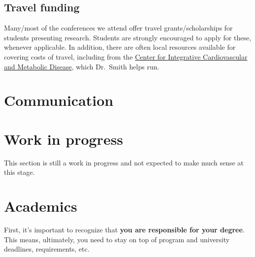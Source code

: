 \documentclass[
  letterpaper,
  DIV=11,
  numbers=noendperiod]{scrreprt}
\begin{document}
\hypertarget{travel-funding}{%
\section{Travel funding}\label{travel-funding}}

Many/most of the conferences we attend offer travel grants/scholarships
for students presenting research. Students are strongly encouraged to
apply for these, whenever applicable. In addition, there are often local
resources available for covering costs of travel, including from the
\href{http://cicmd.center.ufl.edu/resources-2/cicmd-travel-awards-forms/}{Center
for Integrative Cardiovascular and Metabolic Disease}, which Dr.~Smith
helps run.


\hypertarget{sec-communication}{%
\chapter{Communication}\label{sec-communication}}

\begin{tcolorbox}[enhanced jigsaw, colframe=quarto-callout-caution-color-frame, opacityback=0, leftrule=.75mm, bottomrule=.15mm, rightrule=.15mm, left=2mm, toptitle=1mm, colback=white, bottomtitle=1mm, titlerule=0mm, title=\textcolor{quarto-callout-caution-color}{\faFire}\hspace{0.5em}{Danger}, arc=.35mm, toprule=.15mm, breakable, coltitle=black, colbacktitle=quarto-callout-caution-color!10!white, opacitybacktitle=0.6]


\hypertarget{work-in-progress-3}{%
\chapter{Work in progress}\label{work-in-progress-3}}

This section is still a work in progress and not expected to make much
sense at this stage.

\end{tcolorbox}


\hypertarget{sec-academics}{%
\chapter{Academics}\label{sec-academics}}

First, it's important to recognize that \textbf{you are responsible for
your degree}. This means, ultimately, you need to stay on top of program
and university deadlines, requirements, etc.
\end{document}

